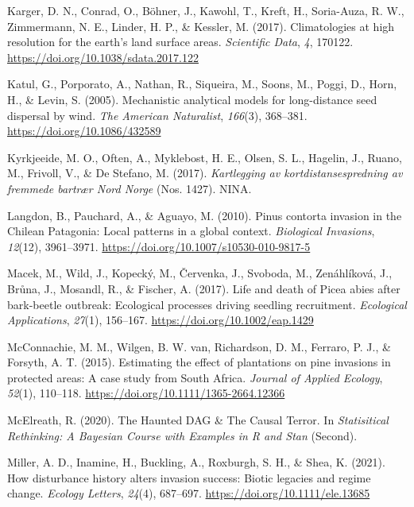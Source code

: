 \documentclass[
]{article}
\begin{document}
\leavevmode\hypertarget{ref-kargerClimatologiesHighResolution2017}{}%
Karger, D. N., Conrad, O., Böhner, J., Kawohl, T., Kreft, H., Soria-Auza, R. W., Zimmermann, N. E., Linder, H. P., \& Kessler, M. (2017). Climatologies at high resolution for the earth's land surface areas. \emph{Scientific Data}, \emph{4}, 170122. \url{https://doi.org/10.1038/sdata.2017.122}

\leavevmode\hypertarget{ref-katulMechanisticAnalyticalModels2005}{}%
Katul, G., Porporato, A., Nathan, R., Siqueira, M., Soons, M., Poggi, D., Horn, H., \& Levin, S. (2005). Mechanistic analytical models for long-distance seed dispersal by wind. \emph{The American Naturalist}, \emph{166}(3), 368--381. \url{https://doi.org/10.1086/432589}

\leavevmode\hypertarget{ref-kyrkjeeideKartleggingAvKortdistansespredning2017}{}%
Kyrkjeeide, M. O., Often, A., Myklebost, H. E., Olsen, S. L., Hagelin, J., Ruano, M., Frivoll, V., \& De Stefano, M. (2017). \emph{Kartlegging av kortdistansespredning av fremmede bartrær Nord Norge} (Nos. 1427). NINA.

\leavevmode\hypertarget{ref-langdonPinusContortaInvasion2010}{}%
Langdon, B., Pauchard, A., \& Aguayo, M. (2010). Pinus contorta invasion in the Chilean Patagonia: Local patterns in a global context. \emph{Biological Invasions}, \emph{12}(12), 3961--3971. \url{https://doi.org/10.1007/s10530-010-9817-5}

\leavevmode\hypertarget{ref-macekLifeDeathPicea2017}{}%
Macek, M., Wild, J., Kopecký, M., Červenka, J., Svoboda, M., Zenáhlíková, J., Brůna, J., Mosandl, R., \& Fischer, A. (2017). Life and death of Picea abies after bark-beetle outbreak: Ecological processes driving seedling recruitment. \emph{Ecological Applications}, \emph{27}(1), 156--167. \url{https://doi.org/10.1002/eap.1429}

\leavevmode\hypertarget{ref-mcconnachieEstimatingEffectPlantations2015}{}%
McConnachie, M. M., Wilgen, B. W. van, Richardson, D. M., Ferraro, P. J., \& Forsyth, A. T. (2015). Estimating the effect of plantations on pine invasions in protected areas: A case study from South Africa. \emph{Journal of Applied Ecology}, \emph{52}(1), 110--118. \url{https://doi.org/10.1111/1365-2664.12366}

\leavevmode\hypertarget{ref-mcelreathHauntedDAGCausal2020}{}%
McElreath, R. (2020). The Haunted DAG \& The Causal Terror. In \emph{Statisitical Rethinking: A Bayesian Course with Examples in R and Stan} (Second).

\leavevmode\hypertarget{ref-millerHowDisturbanceHistory2021}{}%
Miller, A. D., Inamine, H., Buckling, A., Roxburgh, S. H., \& Shea, K. (2021). How disturbance history alters invasion success: Biotic legacies and regime change. \emph{Ecology Letters}, \emph{24}(4), 687--697. \url{https://doi.org/10.1111/ele.13685}
\end{document}
